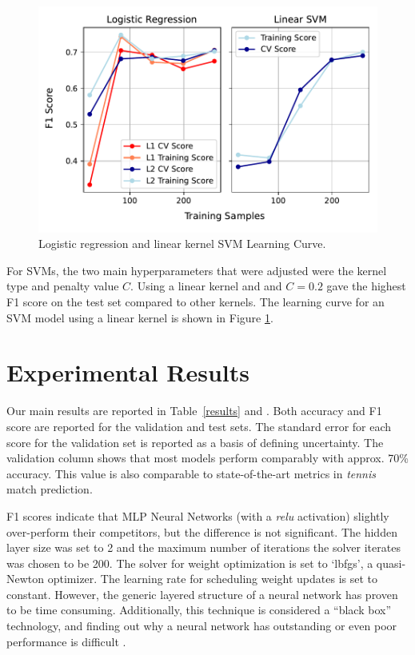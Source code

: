 \begin{figure}[h]
\includegraphics[width=8.cm]{plots/learningcurves.pdf}
\caption{Logistic regression and linear kernel SVM Learning Curve.}
\label{fig:learningcurve}
\centering
\end{figure}




For SVMs, the two main hyperparameters that were adjusted were the kernel type and penalty value $C$. Using a linear kernel and and $C=0.2$ gave the highest F1 score on the test set compared to other kernels. The learning curve for an SVM model using a linear kernel is shown in Figure \ref{fig:learningcurve}.

\section{Experimental Results} \label{experresults}
Our main results are reported in Table~\ref{results} and .
Both accuracy and F1 score are reported for the validation and test sets. The standard error for each score for the validation set is reported as a basis of defining uncertainty. The validation column shows that most models perform comparably with approx. 70\% accuracy. This value is also comparable to state-of-the-art metrics in \textit{tennis} match prediction.

F1 scores indicate that MLP Neural Networks (with a \textit{relu} activation) slightly over-perform their competitors, but the difference is not significant. The hidden layer size was set to 2 and the maximum number of iterations the solver iterates was chosen to be 200. The solver for weight optimization is set to `lbfgs', a quasi-Newton optimizer. The learning rate for scheduling weight updates is set to constant. However, the generic layered structure of a neural network has proven to be time consuming. Additionally, this technique is considered a ``black box'' technology, and finding out why a neural network has outstanding or even poor performance is  difficult \cite{noriega2005multilayer}.

